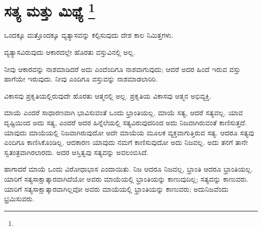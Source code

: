 
\chapter[ಸತ್ಯ ಮತ್ತು ಮಿಥ್ಯೆ ]{ಸತ್ಯ ಮತ್ತು ಮಿಥ್ಯೆ \protect\footnote{}}

ಒಂದಕ್ಕೂ ಮತ್ತೊಂದಕ್ಕೂ ವ್ಯತ್ಯಾಸವನ್ನು ಕಲ್ಪಿಸುವುದು ದೇಶ ಕಾಲ ನಿಮಿತ್ತಗಳು.

ವ್ಯತ್ಯಾಸವಿರುವುದು ಆಕಾರದಲ್ಲೇ ಹೊರತು ವಸ್ತುವಿನಲ್ಲಿ ಅಲ್ಲ.

ನೀವು ಆಕಾರವನ್ನು ನಾಶಮಾಡಿದರೆ ಅದು ಎಂದೆಂದಿಗೂ ನಾಶವಾಗುವುದು; ಆದರೆ ಅದರ ಹಿಂದೆ ಇರುವ ವಸ್ತು ಹಾಗೆಯೇ ಇರುವುದು. ನೀವು ಎಂದಿಗೂ ವಸ್ತುವನ್ನು ನಾಶಮಾಡಲಾರಿರಿ.

ವಿಕಾಸವು ಪ್ರಕೃತಿಯಲ್ಲಿರುವುದೇ ಹೊರತು ಆತ್ಮನಲ್ಲಿ ಅಲ್ಲ. ಪ್ರಕೃತಿಯ ವಿಕಾಸವು ಆತ್ಮನ ಅಭಿವ್ಯಕ್ತಿ.

ಮಾಯೆ ಎಂದರೆ ಸಾಧಾರಣವಾಗಿ ಭಾವಿಸುವಂತೆ ಒಂದು ಭ್ರಾಂತಿಯಲ್ಲ. ಮಾಯೆ ಸತ್ಯ, ಆದರೆ ಸತ್ಯವಲ್ಲ. ಯಾವ ದೃಷ್ಟಿಯಿಂದ ಅದು ಸತ್ಯ, ಎಂದರೆ ಅದರ ಹಿನ್ನೆಲೆಯಲ್ಲಿ ಸತ್ಯವಿರುವುದರಿಂದ ಅದು ನಿಜವಾಗಿರುವಂತೆ ಕಾಣಿಸುತ್ತದೆ. ಯಾವುದು ಮಾಯೆಯಲ್ಲಿ ನಿಜವಾಗಿರುವುದೋ ಅದೇ ಮಾಯೆಯ ಮೂಲಕ ವ್ಯಕ್ತವಾಗುತ್ತಿರುವ ಸತ್ಯ. ಆದರೂ ಸತ್ಯವು ಎಂದಿಗೂ ಕಾಣಿಸಿಕೊಂಡಿಲ್ಲ. ಆದಕಾರಣ ಯಾವುದು ನಮಗೆ ಕಾಣಿಸುವುದೋ ಅದು ನಿಜವಲ್ಲ. ಅದು ತನಗೆ ತಾನೇ ಸ್ವತಂತ್ರವಾಗಿರಲಾರದು. ಅದರ ಆಸ್ತಿತ್ವವು ಸತ್ಯವನ್ನು ಅವಲಂಬಿಸಿದೆ.

ಹಾಗಾದರೆ ಮಾಯೆ ಒಂದು ವಿರೋಧಾಭಾಸ ಎಂದಾಯಿತು. ನಿಜ ಆದರೂ ನಿಜವಲ್ಲ, ಭ್ರಾಂತಿ ಆದರೂ ಭ್ರಾಂತಿಯಲ್ಲ. ಯಾರಿಗೆ ಸತ್ಯಸಾಕ್ಷಾತ್ಕಾರವಾಗಿದೆಯೋ ಅವರು ಮಾಯೆಯಲ್ಲಿ ಭ್ರಾಂತಿಯನ್ನು ಕಾಣುವುದಿಲ್ಲ; ಸತ್ಯವನ್ನು ಕಾಣುವರು. ಯಾರಿಗೆ ಸತ್ಯಸಾಕ್ಷಾತ್ಕಾರವಾಗಿಲ್ಲವೋ ಅವರು ಮಾಯೆಯಲ್ಲಿ ಭ್ರಾಂತಿಯನ್ನು ಕಾಣುವರು; ಅದು\break ನಿಜವೆಂದು ಭ್ರಮಿಸುವರು.


